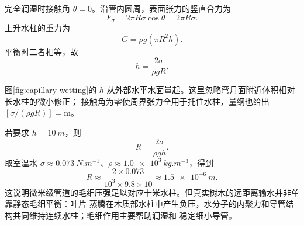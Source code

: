 \begin{xesolution}
完全润湿时接触角 $\theta=0$。沿管内圆周，表面张力的竖直合力为
\begin{equation*}
  F_\sigma=2\pi R\sigma\cos\theta=2\pi R\sigma.
\end{equation*}
上升水柱的重力为
\begin{equation*}
  G=\rho g(\pi R^2h).
\end{equation*}
平衡时二者相等，故
\begin{equation}
  \boxed{h=\frac{2\sigma}{\rho gR}}.
\end{equation}

\capillaryRevisionDiagram
{}\label{fig:capillary-wetting}
图\ref{fig:capillary-wetting}的 $h$ 从外部水平水面量起。这里忽略弯月面附近体积相对长水柱的微小修正；
接触角为零使周界张力全用于托住水柱，量纲也给出 $[\sigma/(\rho gR)]=\mathrm m$。

若要求 $h=\SI{10}{m}$，则
\begin{equation*}
  \boxed{R=\frac{2\sigma}{\rho gh}}.
\end{equation*}
取室温水 $\sigma\approx\SI{0.073}{N.m^{-1}}$、$\rho\approx\SI{1.0e3}{kg.m^{-3}}$，得到
\begin{equation*}
  R\approx\frac{2\times0.073}{10^3\times9.8\times10}
  \approx\SI{1.5e-6}{m}.
\end{equation*}
这说明微米级管道的毛细压强足以对应十米水柱。但真实树木的远距离输水并非单靠静态毛细平衡：叶片
蒸腾在木质部水柱中产生负压，水分子的内聚力和导管结构共同维持连续水柱；毛细作用主要帮助润湿和
稳定细小导管。
\end{xesolution}
